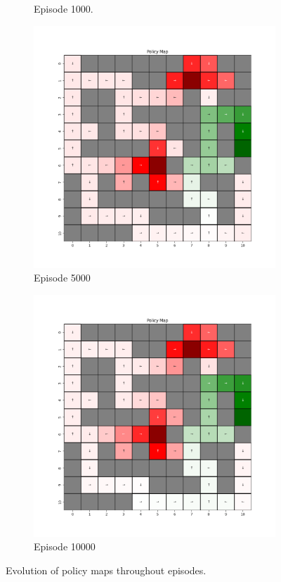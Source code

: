 \documentclass{assignment}
\begin{document}
\begin{figure}[H]
\begin{subfigure}{0.3\textwidth}
    \caption{Episode 1000.}
    \end{subfigure}\hfill
    \begin{subfigure}{0.3\textwidth}
        \includegraphics[width=\textwidth]{figures/policy_td/epsilon_sweep/policy_alpha_0.1_gamma_0.95_epsilon_0.5_iteration_5000.png}
    \caption{Episode 5000}
    \end{subfigure}\hfill
    \begin{subfigure}{0.3\textwidth}
        \includegraphics[width=\textwidth]{figures/policy_td/epsilon_sweep/policy_alpha_0.1_gamma_0.95_epsilon_0.5_iteration_10000.png}
    \caption{Episode 10000}
    \end{subfigure}
    \caption{Evolution of policy maps throughout episodes.}
    \label{fig:epsilon_0.5_td_learning_policy}
\end{figure}
\end{document}
